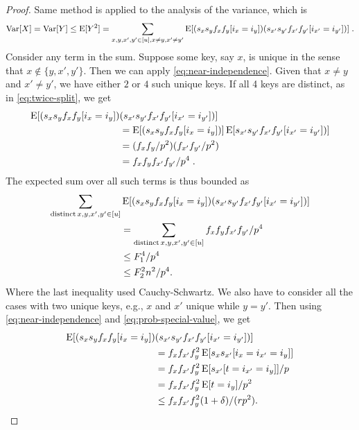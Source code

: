 \begin{proof}
    Same method is applied to the analysis of the variance, which is
    \[
        \operatorname*{Var}[X]
            = \operatorname*{Var}[Y]
            \le \operatorname*{E}[Y^2]
            = \sum_{x,y,x',y' \in [u], x \neq y, x' \neq y'} \operatorname*{E}[(s_x s_y f_x f_y [i_x = i_y]) (s_{x'} s_{y'} f_{x'} f_{y'}[i_{x'} = i_{y'}])]
        \; .
    \] 
    Consider any term in the sum. Suppose some key, say $x$, is unique in the
    sense that $x \not \in \{y,x',y'\}$. Then we can apply \cref{eq:near-independence}.
    Given that $x \neq y$ and $x'\neq y'$, we have either $2$ or $4$ such unique keys.
    If all 4 keys are distinct, as in \cref{eq:twice-split}, we get
    \begin{align*}
        \operatorname*{E}[(s_x s_y f_x f_y [i_x = i_y]) &(s_{x'} s_{y'} f_{x'} f_{y'}[i_{x'} = i_{y'}])]
            \\&= \operatorname*{E}[(s_x s_y f_x f_y [i_x = i_y])] \operatorname*{E}[s_{x'} s_{y'} f_{x'} f_{y'}[i_{x'} = i_{y'}])]
            \\&= (f_x f_y/p^2)(f_{x'} f_{y'}/p^2)
            \\&= f_x f_y f_{x'} f_{y'}/p^4
        \; .
    \end{align*}
    The expected sum over all such terms is thus bounded
    as 
    \begin{equation}\begin{split}
        \sum_{{\rm distinct}\, x,y,x',y'\in[u]}& \operatorname*{E}[(s_x s_y f_x f_y [i_x = i_y]) (s_{x'} s_{y'} f_{x'} f_{y'}[i_{x'} = i_{y'}])]
            \\&= \sum_{{\rm distinct}\,x,y,x',y'\in[u]} f_xf_yf_{x'}f_{y'}/p^4
            \\&\le F_1^4 /p^4
            \\&\le F_2^2 n^2/p^4.\label{eq:distinct}
    \end{split}\end{equation}
    Where the last inequality used Cauchy-Schwartz. We also have to consider all the cases with
    two unique keys, e.g., $x$ and $x'$ unique while $y=y'$. Then using \cref{eq:near-independence}
    and \cref{eq:prob-special-value}, we get
    \begin{align*}
        \E[(s_x s_y f_x f_y [i_x = i_y]) &(s_{x'} s_{y'} f_{x'} f_{y'}[i_{x'} = i_{y'}])]
            \\&= f_x f_{x'} f_y^2 \E[s_x s_{x'} [i_x = i_{x'} = i_y]]
            \\&= f_x f_{x'} f_y^2 \E[s_{x'} [t = i_{x'} = i_y]]/p
            \\&= f_x f_{x'} f_y^2 \E[t = i_y]/p^2
            \\&\le f_x f_{x'} f_y^2(1 + \delta)/(rp^2).

\end{align*}
\end{proof}
